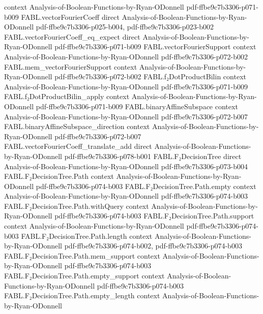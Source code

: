 \begin{theorem}
  {context}
  {Analysis-of-Boolean-Functions-by-Ryan-ODonnell}
  {pdf-ffbe9c7b3306-p071-b009}
\proofstep
  {FABL.vectorFourierCoeff}
  {direct}
  {Analysis-of-Boolean-Functions-by-Ryan-ODonnell}
  {pdf-ffbe9c7b3306-p025-b004,
    pdf-ffbe9c7b3306-p023-b002}
\proofstep
  {FABL.vectorFourierCoeff_eq_expect}
  {direct}
  {Analysis-of-Boolean-Functions-by-Ryan-ODonnell}
  {pdf-ffbe9c7b3306-p071-b009}
\proofstep
  {FABL.vectorFourierSupport}
  {context}
  {Analysis-of-Boolean-Functions-by-Ryan-ODonnell}
  {pdf-ffbe9c7b3306-p072-b002}
\proofstep
  {FABL.mem_vectorFourierSupport}
  {context}
  {Analysis-of-Boolean-Functions-by-Ryan-ODonnell}
  {pdf-ffbe9c7b3306-p072-b002}
\proofstep
  {FABL.f₂DotProductBilin}
  {context}
  {Analysis-of-Boolean-Functions-by-Ryan-ODonnell}
  {pdf-ffbe9c7b3306-p071-b009}
\proofstep
  {FABL.f₂DotProductBilin_apply}
  {context}
  {Analysis-of-Boolean-Functions-by-Ryan-ODonnell}
  {pdf-ffbe9c7b3306-p071-b009}
\proofstep
  {FABL.binaryAffineSubspace}
  {context}
  {Analysis-of-Boolean-Functions-by-Ryan-ODonnell}
  {pdf-ffbe9c7b3306-p072-b007}
\proofstep
  {FABL.binaryAffineSubspace_direction}
  {context}
  {Analysis-of-Boolean-Functions-by-Ryan-ODonnell}
  {pdf-ffbe9c7b3306-p072-b007}
\proofstep
  {FABL.vectorFourierCoeff_translate_add}
  {direct}
  {Analysis-of-Boolean-Functions-by-Ryan-ODonnell}
  {pdf-ffbe9c7b3306-p078-b001}
\proofstep
  {FABL.F₂DecisionTree}
  {direct}
  {Analysis-of-Boolean-Functions-by-Ryan-ODonnell}
  {pdf-ffbe9c7b3306-p073-b004}
\proofstep
  {FABL.F₂DecisionTree.Path}
  {context}
  {Analysis-of-Boolean-Functions-by-Ryan-ODonnell}
  {pdf-ffbe9c7b3306-p074-b003}
\proofstep
  {FABL.F₂DecisionTree.Path.empty}
  {context}
  {Analysis-of-Boolean-Functions-by-Ryan-ODonnell}
  {pdf-ffbe9c7b3306-p074-b003}
\proofstep
  {FABL.F₂DecisionTree.Path.withQuery}
  {context}
  {Analysis-of-Boolean-Functions-by-Ryan-ODonnell}
  {pdf-ffbe9c7b3306-p074-b003}
\proofstep
  {FABL.F₂DecisionTree.Path.support}
  {context}
  {Analysis-of-Boolean-Functions-by-Ryan-ODonnell}
  {pdf-ffbe9c7b3306-p074-b003}
\proofstep
  {FABL.F₂DecisionTree.Path.length}
  {context}
  {Analysis-of-Boolean-Functions-by-Ryan-ODonnell}
  {pdf-ffbe9c7b3306-p074-b002,
    pdf-ffbe9c7b3306-p074-b003}
\proofstep
  {FABL.F₂DecisionTree.Path.mem_support}
  {context}
  {Analysis-of-Boolean-Functions-by-Ryan-ODonnell}
  {pdf-ffbe9c7b3306-p074-b003}
\proofstep
  {FABL.F₂DecisionTree.Path.empty_support}
  {context}
  {Analysis-of-Boolean-Functions-by-Ryan-ODonnell}
  {pdf-ffbe9c7b3306-p074-b003}
\proofstep
  {FABL.F₂DecisionTree.Path.empty_length}
  {context}
  {Analysis-of-Boolean-Functions-by-Ryan-ODonnell}

\end{theorem}
